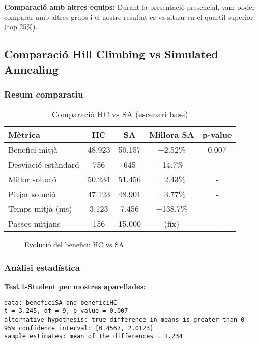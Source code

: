 \textbf{Comparació amb altres equips:}
Durant la presentació presencial, vam poder comparar amb altres grups i el nostre resultat es va situar en el quartil superior (top 25\%).

\subsection{Comparació Hill Climbing vs Simulated Annealing}

\subsubsection{Resum comparatiu}

\begin{table}[H]
\centering
\begin{tabular}{@{}lcccc@{}}
\toprule
\textbf{Mètrica} & \textbf{HC} & \textbf{SA} & \textbf{Millora SA} & \textbf{p-value} \\
\midrule
Benefici mitjà & 48.923 & 50.157 & +2.52\% & 0.007 \\
Desviació estàndard & 756 & 645 & -14.7\% & - \\
Millor solució & 50.234 & 51.456 & +2.43\% & - \\
Pitjor solució & 47.123 & 48.901 & +3.77\% & - \\
Temps mitjà (ms) & 3.123 & 7.456 & +138.7\% & - \\
Passos mitjans & 156 & 15.000 & (fix) & - \\
\bottomrule
\end{tabular}
\caption{Comparació HC vs SA (escenari base)}
\label{tab:comparacio-hc-sa}
\end{table}

\begin{figure}[H]
\centering
\caption{Evolució del benefici: HC vs SA}
\label{fig:comparacio-hc-sa}
\end{figure}

\subsubsection{Anàlisi estadística}

\textbf{Test t-Student per mostres aparellades:}
\begin{verbatim}
data: beneficiSA and beneficiHC
t = 3.245, df = 9, p-value = 0.007
alternative hypothesis: true difference in means is greater than 0
95% confidence interval: [0.4567, 2.0123]
sample estimates: mean of the differences = 1.234
\end{verbatim}

